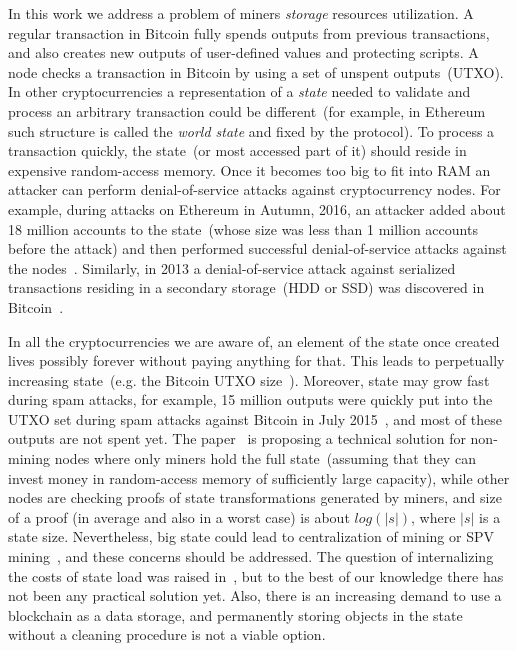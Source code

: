 \documentclass[]{llncs}   %
\begin{document}
In this work we address a problem of miners {\em storage} resources utilization.
A regular transaction in Bitcoin fully spends outputs from previous transactions, and
also creates new outputs of user-defined values and protecting scripts.
A node checks a transaction in
Bitcoin by using a set of unspent outputs~(UTXO). In other cryptocurrencies a
representation of a {\em state} needed to validate and process an arbitrary
transaction could be different~(for example, in Ethereum~\cite{ethyp} such
structure is called the {\em world state} and fixed by the protocol). To process
a transaction quickly, the state~(or most accessed part of it) should reside in
expensive random-access memory. Once it becomes too big to fit into RAM an attacker can
perform denial-of-service attacks against cryptocurrency nodes. For example,
during attacks on Ethereum in Autumn, 2016, an attacker added about 18 million
accounts to the state~(whose size was less than 1 million accounts before the
attack) and then performed successful denial-of-service attacks against the
nodes~\cite{eth2016dos}. Similarly, in 2013 a denial-of-service attack against
serialized transactions residing in a secondary storage~(HDD or SSD) was
discovered in Bitcoin~\cite{vasek2014empirical}.

In all the cryptocurrencies we are aware of, an element of the state once created
lives possibly forever without paying anything for that. This leads to perpetually increasing
state~(e.g. the Bitcoin UTXO size~\cite{utxoChart}). Moreover, state may grow fast during spam attacks, for
example, 15 million outputs were quickly put into the UTXO set during spam attacks
against Bitcoin in July 2015~\cite{bitcoin2015flood}, and most of these outputs
are not spent yet. The paper~\cite{reyzin2016improving} is proposing a technical
solution for non-mining nodes where only miners hold the full state~(assuming
that they can invest money in random-access memory of sufficiently large
capacity), while other nodes are checking proofs of state transformations
generated by miners, and size of a proof (in average and also in a worst case)
is about $log(|s|)$, where $|s|$ is a state size. Nevertheless, big state
could lead to centralization of mining or SPV mining~\cite{spvMining}, and these
concerns should be addressed. The question of internalizing the costs of
state load was raised in~\cite{Moeser2015}, but to the best of our knowledge there has not been any
practical solution yet. Also, there is an increasing demand to use a
blockchain as a data storage, and permanently storing objects in the state
without a cleaning procedure is not a viable option.
\end{document}
